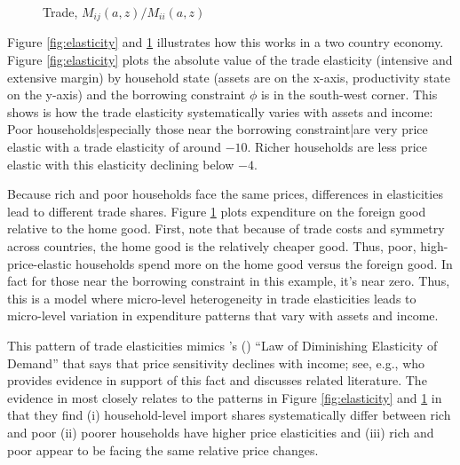 \documentclass[12pt,pdftex]{article}
\def\citeapos#1{\citeauthor{#1}'s (\citeyear{#1})}
\begin{document}
\begin{onehalfspacing}
{\begin{figure}[!t]
\caption{Trade, $M_{ij}(a,z) / M_{ii}(a,z)$ }\label{fig:micro-trade}
\end{figure}


}

Figure \ref{fig:elasticity} and \ref{fig:micro-trade} illustrates how this works in a two country economy. Figure \ref{fig:elasticity} plots the absolute value of the trade elasticity (intensive and extensive margin) by household state (assets are on the x-axis, productivity state on the y-axis) and the borrowing constraint $\phi$ is in the south-west corner. This shows is how the trade elasticity systematically varies with assets and income: Poor households|especially those near the borrowing constraint|are very price elastic with a trade elasticity of around $-10$. Richer households are less price elastic with this elasticity declining below $-4.$

Because rich and poor households face the same prices, differences in elasticities lead to different trade shares. Figure \ref{fig:micro-trade} plots expenditure on the foreign good relative to the home good. First, note that because of trade costs and symmetry across countries, the home good is the relatively cheaper good. Thus, poor, high-price-elastic households spend more on the home good versus the foreign good. In fact for those near the borrowing constraint in this example, it's near zero. Thus, this is a model where micro-level heterogeneity in trade elasticities leads to micro-level variation in expenditure patterns that vary with assets and income.

This pattern of trade elasticities mimics \citeapos{harrod1936trade} ``Law of Diminishing Elasticity of Demand'' that says that price sensitivity declines with income; see, e.g., \citet{sangani2022markups} who provides evidence in support of this fact and discusses related literature. The evidence in \citet*{auer2022unequal} most closely relates to the patterns in Figure \ref{fig:elasticity} and \ref{fig:micro-trade} in that they find (i) household-level import shares systematically differ between rich and poor (ii) poorer households have higher price elasticities and (iii) rich and poor appear to be facing the same relative price changes.


\end{onehalfspacing}
\end{document}
